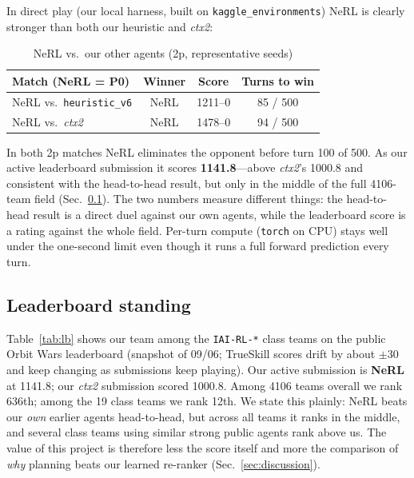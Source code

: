 \documentclass[conference]{IEEEtran}
\begin{document}
In direct play (our local harness, built on \texttt{kaggle\_environments}) NeRL is clearly stronger than both our heuristic and \textit{ctx2}:

\begin{table}[htbp]
\caption{NeRL vs.\ our other agents (2p, representative seeds)}
\label{tab:planner_h2h}
\centering
\begin{tabular}{lccc}
\toprule
\textbf{Match (NeRL = P0)} & \textbf{Winner} & \textbf{Score} & \textbf{Turns to win} \\
\midrule
NeRL vs.\ \texttt{heuristic\_v6} & NeRL & 1211--0 & 85 / 500 \\
NeRL vs.\ \textit{ctx2} & NeRL & 1478--0 & 94 / 500 \\
\bottomrule
\end{tabular}
\end{table}

In both 2p matches NeRL eliminates the opponent before turn 100 of 500. As our active leaderboard submission it scores \textbf{1141.8}---above \textit{ctx2}'s 1000.8 and consistent with the head-to-head result, but only in the middle of the full 4106-team field (Sec.~\ref{sec:lbstanding}). The two numbers measure different things: the head-to-head result is a direct duel against our own agents, while the leaderboard score is a rating against the whole field. Per-turn compute (\texttt{torch} on CPU) stays well under the one-second limit even though it runs a full forward prediction every turn.

\subsection{Leaderboard standing}
\label{sec:lbstanding}
Table~\ref{tab:lb} shows our team among the \texttt{IAI-RL-*} class teams on the public Orbit Wars leaderboard (snapshot of 09/06; TrueSkill scores drift by about $\pm 30$ and keep changing as submissions keep playing). Our active submission is \textbf{NeRL} at 1141.8; our \textit{ctx2} submission scored 1000.8. Among 4106 teams overall we rank 636th; among the 19 class teams we rank 12th. We state this plainly: NeRL beats our \emph{own} earlier agents head-to-head, but across all teams it ranks in the middle, and several class teams using similar strong public agents rank above us. The value of this project is therefore less the score itself and more the comparison of \emph{why} planning beats our learned re-ranker (Sec.~\ref{sec:discussion}).
\end{document}
